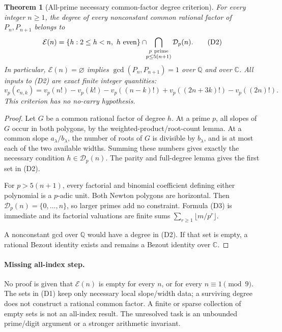 \documentclass[11pt]{article}
\newtheorem{theorem}{Theorem}
\begin{document}
\begin{theorem}[All-prime necessary common-factor degree criterion]\label{thm:quintic-all-prime-degree}
For every integer $n\ge1$, the degree of every nonconstant common
rational factor of $P_n,P_{n+1}$ belongs to
\[
 {\mathcal E}(n)=
 \{h:2\le h<n,\ h\text{ even}\}
 \cap\!\!\bigcap_{\substack{p\ {\rm prime}\\p\le5(n+1)}}
             {\mathcal D}_p(n).                              \tag{D2}
\]
In particular, $\mathcal E(n)=\varnothing$ implies
$\gcd(P_n,P_{n+1})=1$ over $\mathbb Q$ and over $\mathbb C$.
All inputs to (D2) are exact finite integer quantities:
\[
 v_p(c_{n,k})=
 v_p(n!)-v_p(k!)-v_p((n-k)!)
       +v_p((2n+3k)!)-v_p((2n)!).                            \tag{D3}
\]
This criterion has no no-carry hypothesis.
\end{theorem}
\begin{proof}
Let $G$ be a common rational factor of degree $h$.
At a prime $p$, all slopes of $G$ occur in both polygons,
by the weighted-product/root-count lemma.
At a common slope $a_\lambda/b_\lambda$, the number of roots
of $G$ is divisible by $b_\lambda$, and is at most each of the
two available widths. Summing these numbers gives exactly
the necessary condition $h\in\mathcal D_p(n)$.
The parity and full-degree lemma gives the first set in (D2).

For $p>5(n+1)$, every factorial and binomial coefficient defining
either polynomial is a $p$-adic unit. Both Newton polygons
are horizontal. Then $\mathcal D_p(n)=\{0,\ldots,n\}$,
so larger primes add no constraint.
Formula (D3) is immediate and its factorial valuations are
finite sums $\sum_{r\ge1}\lfloor m/p^r\rfloor$.

A nonconstant gcd over $\mathbb Q$ would have a degree in (D2).
If that set is empty, a rational Bezout identity exists and
remains a Bezout identity over $\mathbb C$.
\end{proof}

\paragraph{Missing all-index step.}
No proof is given that $\mathcal E(n)$ is empty for every $n$,
or for every $n\equiv1\pmod9$.
The sets in (D1) keep only necessary local slope/width data;
a surviving degree does not construct a rational common factor.
A finite or sparse collection of empty sets is not an
all-index result. The unresolved task is an unbounded
prime/digit argument or a stronger arithmetic invariant.
\end{document}
